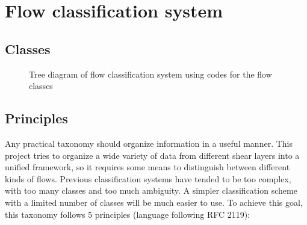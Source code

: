 %
\chapter{Flow classification system}

\section{Classes}



\begin{figure}
    \centering
    
    \caption{Tree diagram of flow classification system using codes for the
    flow classes}
\end{figure}

\section{Principles}

Any practical taxonomy should organize information in a useful manner.  This
project tries to organize a wide variety of data from different shear layers
into a unified framework, so it requires some means to distinguish between
different kinds of flows.  Previous classification systems have tended to be
too complex, with too many classes and too much ambiguity.  A simpler
classification scheme with a limited number of classes will be much easier to
use.  To achieve this goal, this taxonomy follows 5 principles (language
following RFC 2119):

